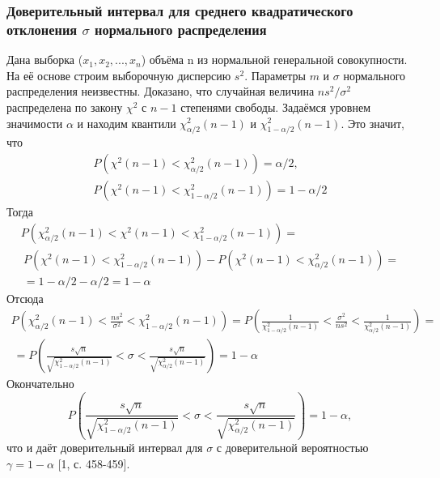 \documentclass[12pt,a4paper]{scrartcl}
\begin{document}
    \subsubsection{Доверительный интервал для среднего квадратического отклонения $\sigma$ нормального распределения}
    Дана выборка ($x_{1},x_{2}, ... ,x_{n}$) объёма n из нормальной генеральной совокупности. На её основе строим выборочную дисперсию $s^{2}$. Параметры $m$ и $\sigma$ нормального распределения неизвестны. Доказано, что случайная величина $ns^{2}/\sigma^{2}$ распределена по закону $\chi^{2}$ с $n-1$ степенями свободы.
    \newline
    Задаёмся уровнем значимости $\alpha$ и находим квантили $\chi^{2}_{\alpha/2}(n-1)$ и $\chi^{2}_{1-\alpha/2}(n-1)$.
    \newline
    Это значит, что 
    \begin{equation}
        \begin{split}
        P\left(\chi^{2}(n-1) < \chi^{2}_{\alpha/2}(n-1)\right) = \alpha/2, \\
        P\left(\chi^{2}(n-1) < \chi^{2}_{1-\alpha/2}(n-1)\right) = 1-\alpha/2
        \end{split}
        \label{P_chi_2x2}        
    \end{equation}
    Тогда
    \begin{multline}
         P\left(\chi^{2}_{\alpha/2}(n-1) < \chi^{2}(n-1) < \chi^{2}_{1-\alpha/2}(n-1)\right) = \\\
          P\left(\chi^{2}(n-1) < \chi^{2}_{1-\alpha/2}(n-1)\right) -P\left(\chi^{2}(n-1) < \chi^{2}_{\alpha/2}(n-1)\right) = \\\ = 1 - \alpha/2 -\alpha/2 = 1 - \alpha
          \label{P_chi_2}
    \end{multline}
    Отсюда
    \begin{multline}
         P\left(\chi^{2}_{\alpha/2}(n-1) < \frac{ns^{2}}{\sigma^{2}} < \chi^{2}_{1-\alpha/2}(n-1)\right) =
          P\left(\frac{1}{\chi^{2}_{1-\alpha/2}(n-1)} < \frac{\sigma^{2}}{ns^{2}} < \frac{1}{\chi^{2}_{\alpha/2}(n-1)} \right) = \\\ =
          P\left(\frac{s\sqrt{n}}{\sqrt{\chi^{2}_{1-\alpha/2}(n-1)}} < \sigma <  \frac{s\sqrt{n}}{\sqrt{\chi^{2}_{\alpha/2}(n-1)}}\right) = 1- \alpha
          \label{interv}
    \end{multline}
    Окончательно
    \begin{equation}
         P\left(\frac{s\sqrt{n}}{\sqrt{\chi^{2}_{1-\alpha/2}(n-1)}} < \sigma <  \frac{s\sqrt{n}}{\sqrt{\chi^{2}_{\alpha/2}(n-1)}}\right) = 1- \alpha,
         \label{fin_interval}
    \end{equation}
    что и даёт доверительный интервал для $\sigma$ с доверительной вероятностью $\gamma = 1 - \alpha$ [1, с. 458-459].
    
\end{document}
